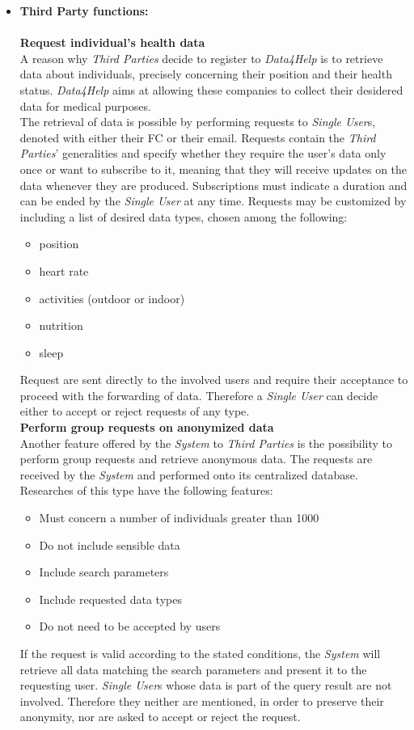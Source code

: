 \documentclass[titlepage]{article}
\begin{document}
\begin{itemize}
	\item{\bf Third Party functions:}\\
	\\
	{\bf Request individual’s health data}\\
A reason why {\it Third Parties} decide to register to {\it Data4Help} is to retrieve data about individuals, precisely concerning their position and their health status. {\it Data4Help} aims at allowing these companies to collect their desidered data for medical purposes. \\
The retrieval of data is possible by performing requests to {\it Single User}s, denoted with either their FC or their email. Requests contain the {\it Third Parties}’ generalities and specify whether they require the user’s data only once or want to subscribe to it, meaning that they will receive updates on the data whenever they are produced. Subscriptions must indicate a duration and can be ended by the {\it Single User} at any time. Requests may be customized by including a list of desired data types, chosen among the following:
\begin{itemize}
\item position
\item heart rate
\item activities (outdoor or indoor)
\item nutrition
\item sleep \\
\end{itemize}
Request are sent directly to the involved users and require their acceptance to proceed with the forwarding of data. Therefore a {\it Single User} can decide either to accept or reject requests of any type.\\

{\bf Perform group requests on anonymized data}\\
Another feature offered by the {\it System} to {\it Third Parties} is the possibility to perform group requests and retrieve anonymous data. The requests are received by the {\it System} and performed onto its centralized database. Researches of this type have the following features:
\begin{itemize}
\item Must concern a number of individuals greater than 1000
\item Do not include sensible data
\item Include search parameters
\item Include requested data types
\item Do not need to be accepted by users\\
\end{itemize}
If the request is valid according to the stated conditions, the {\it System} will retrieve all data matching the search parameters and present it to the requesting user. {\it Single User}s whose data is part of the query result are not involved. Therefore they neither are mentioned, in order to preserve their anonymity, nor are asked to accept or reject the request.\\


\end{itemize}
\end{document}
